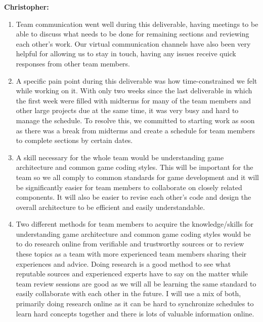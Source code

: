 \documentclass[12pt, titlepage]{article}
\begin{document}
\textbf{Christopher:}
\begin{enumerate}
	\item Team communication went well during this deliverable, having meetings 
	to be able to discuss what needs to be done for remaining sections and reviewing 
	each other's work. Our virtual communication channels have also been very helpful 
	for allowing us to stay in touch, having any issues receive quick responses from 
	other team members.
	\item A specific pain point during this deliverable was how time-constrained
	we felt while working on it. With only two weeks since the last deliverable 
	in which the first week were filled with midterms for many of the team members 
	and other large projects due at the same time, it was very busy and hard to 
	manage the schedule. To resolve this, we committed to starting work as soon as
	there was a break from midterms and create a schedule for team members to complete
	sections by certain dates.
	\item A skill necessary for the whole team would be understanding game architecture
	and common game coding styles. This will be important for the team so we all comply
	to common standards for game development and it will be significantly easier for 
	team members to collaborate on closely related components. It will also be easier
	to revise each other’s code and design the overall architecture to be efficient 
	and easily understandable.
	\item Two different methods for team members to acquire the knowledge/skills for
	understanding game architecture and common game coding styles would be to do research
	online from verifiable and trustworthy sources or to review these topics as a team 
	with more experienced team members sharing their experiences and advice. Doing 
	research is a good method to see what reputable sources and experienced experts 
	have to say on the matter while team review sessions are good as we will all be learning 
	the same standard to easily collaborate with each other in the future. I will use a 
	mix of both, primarily doing research online as it can be hard to synchronize schedules
	to learn hard concepts together and there is lots of valuable information online.
\end{enumerate}
\end{document}
